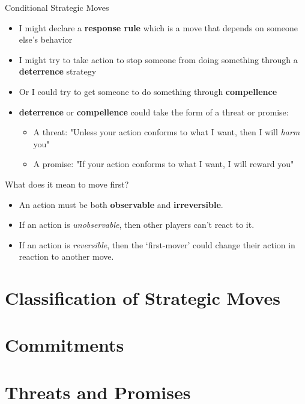 \documentclass{beamer}
\theoremstyle{plain}
\begin{document}
\begin{frame}{}
  Conditional Strategic Moves 
  \begin{itemize}
    \item I might declare a \textbf{response rule} 
    which is a move that depends on someone else's behavior
    \item I might try to take action to stop someone from doing something 
    through a \textbf{deterrence} strategy
    \item Or I could try to get someone to do something 
    through \textbf{compellence}
    \item \textbf{deterrence} or \textbf{compellence} could take the form 
    of a \alert{threat} or \alert{promise}:
    \begin{itemize}
      \item A \alert{threat}: 
      "Unless your action conforms to what I want, then I will \textit{harm} you"
      \item A \alert{promise}:
      "If your action conforms to what I want, I will \alert{reward} you"
    \end{itemize}
  \end{itemize}
\end{frame}


\begin{frame}{What does it mean to move first?}
  \begin{itemize}
    \item An action must be both \textbf{observable} and \textbf{irreversible}.
    \item If an action is \textit{unobservable}, 
    then other players can't react to it.
    \item If an action is \textit{reversible},
    then the `first-mover' could change their action in reaction to another move.
  \end{itemize} 
\end{frame}

\section{Classification of Strategic Moves}


\section{Commitments}


\section{Threats and Promises}

\end{document}

